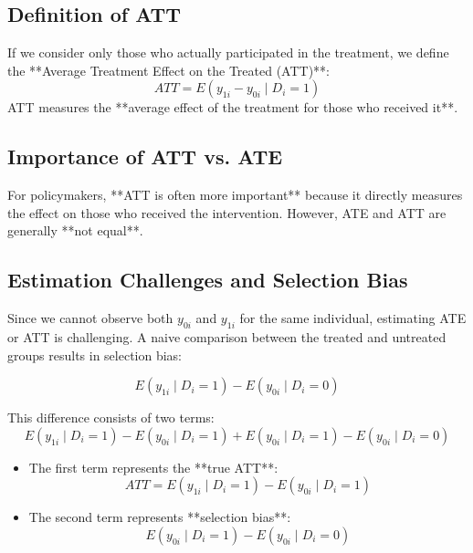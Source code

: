 \documentclass[10pt, oneside]{article}
\begin{document}
\subsection{Definition of ATT}
If we consider only those who actually participated in the treatment, we define the **Average Treatment Effect on the Treated (ATT)**:
\begin{equation}
ATT = E(y_{1i} - y_{0i} \mid D_i = 1)
\end{equation}
ATT measures the **average effect of the treatment for those who received it**. 

\subsection{Importance of ATT vs. ATE}
For policymakers, **ATT is often more important** because it directly measures the effect on those who received the intervention. However, ATE and ATT are generally **not equal**.

\subsection{Estimation Challenges and Selection Bias}
Since we cannot observe both $y_{0i}$ and $y_{1i}$ for the same individual, estimating ATE or ATT is challenging. A naive comparison between the treated and untreated groups results in selection bias:

\begin{equation}
E(y_{1i} \mid D_i = 1) - E(y_{0i} \mid D_i = 0)
\end{equation}

This difference consists of two terms:
\begin{equation}
E(y_{1i} \mid D_i = 1) - E(y_{0i} \mid D_i = 1) + E(y_{0i} \mid D_i = 1) - E(y_{0i} \mid D_i = 0)
\end{equation}

\begin{itemize}
    \item The first term represents the **true ATT**:
    \begin{equation}
    ATT = E(y_{1i} \mid D_i = 1) - E(y_{0i} \mid D_i = 1)
    \end{equation}
    \item The second term represents **selection bias**:
    \begin{equation}
    E(y_{0i} \mid D_i = 1) - E(y_{0i} \mid D_i = 0)
    \end{equation}
\end{itemize}
\end{document}
